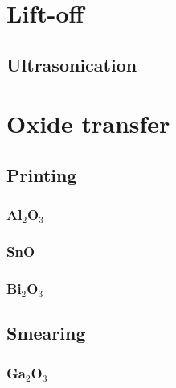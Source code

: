 \documentclass[../Matt_Gebert_Honours_Thesis.tex]{subfiles}
\begin{document}
	\section{Lift-off}\label{}
	\subsection{Ultrasonication}
	
	\section{Oxide transfer}
	\subsection{Printing}
	\subsubsection{Al$_2$O$_3$}
	\subsubsection{SnO}
	\subsubsection{Bi$_2$O$_3$}
	
	\subsection{Smearing}
	\subsubsection{Ga$_2$O$_3$}
	
\end{document}
